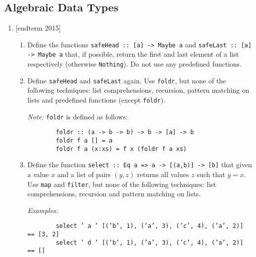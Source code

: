 \documentclass{article}
\def\code#1{\texttt{#1}}
\begin{document}
\subsection{Algebraic Data Types}
\begin{enumerate}
    \item {[endterm 2015]}
        \begin{enumerate}
            \item Define the functions \code{safeHead :: [a] -> Maybe a} and \code{safeLast :: [a] -> Maybe a} that, if possible, return the first and last element of a list respectively (otherwise \code{Nothing}). Do not use any predefined functions.
            \item Define \code{safeHead} and \code{safeLast} again. Use \code{foldr}, but none of the following techniques: list comprehensions, recursion, pattern matching on lists and predefined functions (except \code{foldr}). \par
            \textit{Note:} \code{foldr} is defined as follows:
            \begin{verbatim}
        foldr :: (a -> b -> b) -> b -> [a] -> b
        foldr f a [] = a
        foldr f a (x:xs) = f x (foldr f a xs)
            \end{verbatim}
            \item Define the function \code{select :: Eq a => a -> [(a,b)] -> [b]} that given a value $x$ and a list of pairs $(y,z)$ returns all values $z$ such that $y = x$. Use \code{map} and \code{filter}, but none of the following techniques: list comprehensions, recursion and pattern matching on lists. \par
            \textit{Examples:}
            \begin{verbatim}
        select ’ a ’ [(’b’, 1), (’a’, 3), (’c’, 4), (’a’, 2)] == [3, 2]
        select ’ d ’ [(’b’, 1), (’a’, 3), (’c’, 4), (’a’, 2)] == []
            \end{verbatim}
        \end{enumerate}


\end{enumerate}
\end{document}

